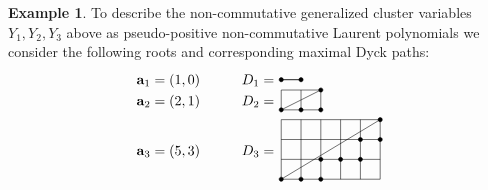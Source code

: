 \documentclass[10pt]{amsart}
\theoremstyle{definition}
\newtheorem{example}[theorem]{Example}
\newcommand{\bfa}{\mathbf{a}}
\begin{document}
\begin{example}
 To describe the non-commutative generalized cluster variables $Y_1,Y_2,Y_3$ above as pseudo-positive non-commutative Laurent polynomials we consider the following roots and corresponding maximal Dyck paths:
 \[\begin{array}{lccl}
 \raisebox{-0.15em}{$\bfa_1=(1,0)$} & & & \raisebox{-0.15em}{$D_1=$ }
 \begin{tikzpicture}
 \begin{scope}[scale=0.5]
 \draw[step=1.0, black, thin] (0,0) grid (1,0);
 \draw[black, thin] (0,0) -- (1,0);
 \draw[black, fill=black] (0,0) circle (3pt);
 \draw[black, fill=black] (1,0) circle (3pt);
 \end{scope}
 \end{tikzpicture}\\
 \raisebox{0.5em}{$\bfa_2=(2,1)$} & & & \raisebox{0.5em}{$D_2=$ }
 \begin{tikzpicture}
 \begin{scope}[scale=0.5]
 \draw[step=1.0, black, thin] (0,0) grid (2,1);
 \draw[black, thin] (0,0) -- (2,1);
 \draw[black, fill=black] (0,0) circle (3pt);
 \draw[black, fill=black] (1,0) circle (3pt);
 \draw[black, fill=black] (2,0) circle (3pt);
 \draw[black, fill=black] (2,1) circle (3pt);
 \end{scope}
 \end{tikzpicture}\\
 \raisebox{1.9em}{$\bfa_3=(5,3)$} & & & \raisebox{1.9em}{$D_3=$ }
 \begin{tikzpicture}
 \begin{scope}[scale=0.5]
 \draw[step=1.0, black, thin] (0,0) grid (5,3);
 \draw[black, thin] (0,0) -- (5,3);
 \draw[black, fill=black] (0,0) circle (3pt);
 \draw[black, fill=black] (1,0) circle (3pt);
 \draw[black, fill=black] (2,0) circle (3pt);
 \draw[black, fill=black] (2,1) circle (3pt);
 \draw[black, fill=black] (3,1) circle (3pt);
 \draw[black, fill=black] (4,1) circle (3pt);
 \draw[black, fill=black] (4,2) circle (3pt);
 \draw[black, fill=black] (5,2) circle (3pt);
 \draw[black, fill=black] (5,3) circle (3pt);
 \end{scope}
 \end{tikzpicture}
 \end{array}\]

 \end{example}
\end{document}

